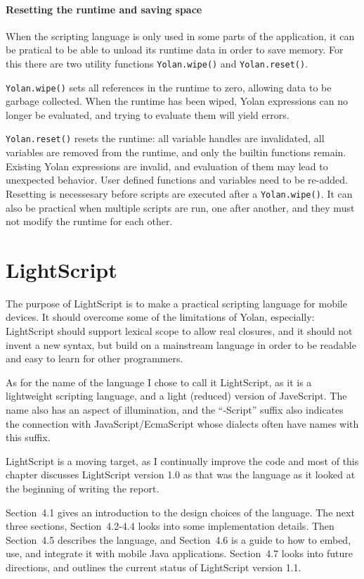 \documentclass[11pt]{report}
\begin{document}
\subsubsection{Resetting the runtime and saving space}
When the scripting language is only used in some parts of the application, it can be pratical to be able to unload its runtime data in order to save memory. 
For this there are two utility functions \verb|Yolan.wipe()| and \verb|Yolan.reset()|.

\verb|Yolan.wipe()| sets all references in the runtime to zero, allowing data to be garbage collected.
When the runtime has been wiped, Yolan expressions can no longer be evaluated, and trying to evaluate them will yield errors. 

\verb|Yolan.reset()| resets the runtime: all variable handles are invalidated, all variables are removed from the runtime, and only the builtin functions remain. Existing Yolan expressions are invalid, and evaluation of them may lead to unexpected behavior. User defined functions and variables need to be re-added.
Resetting is necessesary before scripts are executed after a \verb|Yolan.wipe()|.
It can also be practical when multiple scripts are run, one after another, and they must not modify the runtime for each other.

\chapter{LightScript}
\label{lightscript}

The purpose of LightScript is to make a practical scripting language for mobile devices. 
It should overcome some of the limitations of Yolan, especially: LightScript should support lexical scope to allow real closures, and it should not invent a new syntax, but build on a mainstream language in order to be readable and easy to learn for other programmers.

As for the name of the language I chose to call it LightScript, as it is a lightweight scripting language, and a light (reduced) version of JaveScript. The name also has an aspect of illumination, and the ``-Script'' suffix also indicates the connection with JavaScript/EcmaScript whose dialects often have names with this suffix.

LightScript is a moving target, as I continually improve the code and most of this chapter discusses LightScript version 1.0 as that was the language as it looked at the beginning of writing the report.

Section~4.1 gives an introduction to the design choices of the language. The next three sections, Section~4.2-4.4 looks into some implementation details. Then Section~4.5 describes the language, and Section~4.6 is a guide to how to embed, use, and integrate it with mobile Java applications.
Section~4.7 looks into future directions, and outlines the current status of LightScript version 1.1. 
\end{document}
